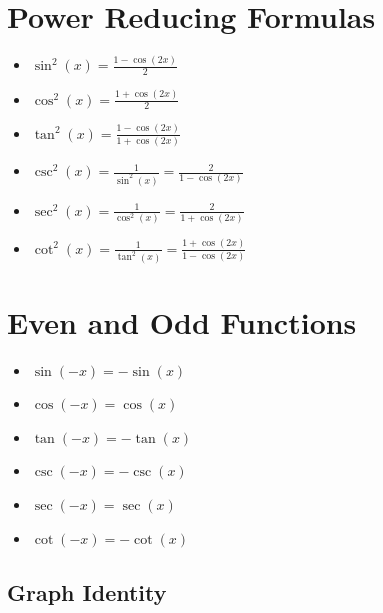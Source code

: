 \section{Power Reducing Formulas}

\begin{itemize}

    \item \( \sin^2(x) = \frac{1 - \cos(2x)}{2} \)

    \item \( \cos^2(x) = \frac{1 + \cos(2x)}{2} \)

    \item \( \tan^2(x) = \frac{1 - \cos(2x)}{1 + \cos(2x)}\)

    \item \( \csc^2(x) = \frac{1}{\sin^2(x)} = \frac{2}{1 - \cos(2x)} \)

    \item \( \sec^2(x) = \frac{1}{\cos^2(x)} = \frac{2}{1 + \cos(2x)} \)

    \item \( \cot^2(x) = \frac{1}{\tan^2(x)} = \frac{1 + \cos(2x)}{1 - \cos(2x)}\)

\end{itemize}

\section{Even and Odd Functions}

\begin{itemize}

    \item \( \sin(-x) = -\sin(x) \)

    \item \( \cos(-x) = \cos(x) \)

    \item \( \tan(-x) = -\tan(x) \)

    \item \( \csc(-x) = -\csc(x) \)

    \item \( \sec(-x) = \sec(x) \)

    \item \( \cot(-x) = -\cot(x) \)

\end{itemize}

\subsection{Graph Identity}

